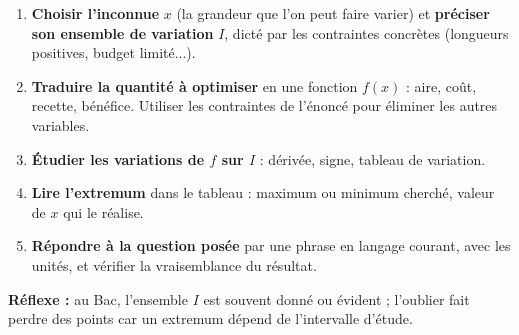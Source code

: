 \documentclass[11pt]{article}
\begin{document}
\begin{methode}
\begin{enumerate}
\item \textbf{Choisir l'inconnue} $x$ (la grandeur que l'on peut faire varier) et \textbf{préciser son ensemble de variation} $I$, dicté par les contraintes concrètes (longueurs positives, budget limité...).
\item \textbf{Traduire la quantité à optimiser} en une fonction $f(x)$ : aire, coût, recette, bénéfice. Utiliser les contraintes de l'énoncé pour éliminer les autres variables.
\item \textbf{Étudier les variations de $f$ sur $I$} : dérivée, signe, tableau de variation.
\item \textbf{Lire l'extremum} dans le tableau : maximum ou minimum cherché, valeur de $x$ qui le réalise.
\item \textbf{Répondre à la question posée} par une phrase en langage courant, avec les unités, et vérifier la vraisemblance du résultat.
\end{enumerate}
\textbf{Réflexe :} au Bac, l'ensemble $I$ est souvent donné ou évident ; l'oublier fait perdre des points car un extremum dépend de l'intervalle d'étude.
\end{methode}
\end{document}

